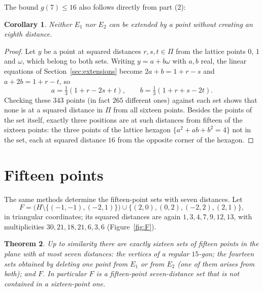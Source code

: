 \documentclass[11pt]{amsart}
\newtheorem{theorem}{Theorem}
\newtheorem{corollary}[theorem]{Corollary}
\theoremstyle{definition}
\theoremstyle{remark}
\begin{document}
The bound $g(7)\le16$ also follows directly from part (2):

\begin{corollary}\label{cor:17}
Neither $E_1$ nor $E_2$ can be extended by a point without creating an eighth distance.
\end{corollary}

\begin{proof}
Let $y$ be a point at squared distances $r,s,t\in\Pi$ from the lattice points $0$, $1$ and $\omega$, which
belong to both sets. Writing $y=a+b\omega$ with $a,b$ real, the linear equations of
Section~\ref{sec:extensions} become $2a+b=1+r-s$ and $a+2b=1+r-t$, so
\[
  a=\tfrac13(1+r-2s+t),\qquad b=\tfrac13(1+r+s-2t).
\]
Checking these $343$ points (in fact $265$ different ones) against each set shows that none is at a squared
distance in $\Pi$ from all sixteen points. Besides the points of the set itself, exactly three positions are
at such distances from fifteen of the sixteen points: the three points of the lattice hexagon
$\{a^2+ab+b^2=4\}$ not in the set, each at squared distance $16$ from the opposite corner of the hexagon.
\end{proof}

\section{Fifteen points}\label{sec:fifteen}

The same methods determine the fifteen-point sets with seven distances. Let
\[
  F=\bigl(H\setminus\{(-1,-1),(-2,1)\}\bigr)\cup\{(2,0),(0,2),(-2,2),(2,1)\},
\]
in triangular coordinates; its squared distances are again $1,3,4,7,9,12,13$, with multiplicities
$30,21,18,21,6,3,6$ (Figure~\ref{fig:F}).

\begin{theorem}\label{thm:15}
Up to similarity there are exactly sixteen sets of fifteen points in the plane with at most seven
distances: the vertices of a regular $15$-gon; the fourteen sets obtained by deleting one point from
$E_1$ or from $E_2$ (one of them arises from both); and $F$. In particular $F$ is a fifteen-point
seven-distance set that is not contained in a sixteen-point one.
\end{theorem}
\end{document}
